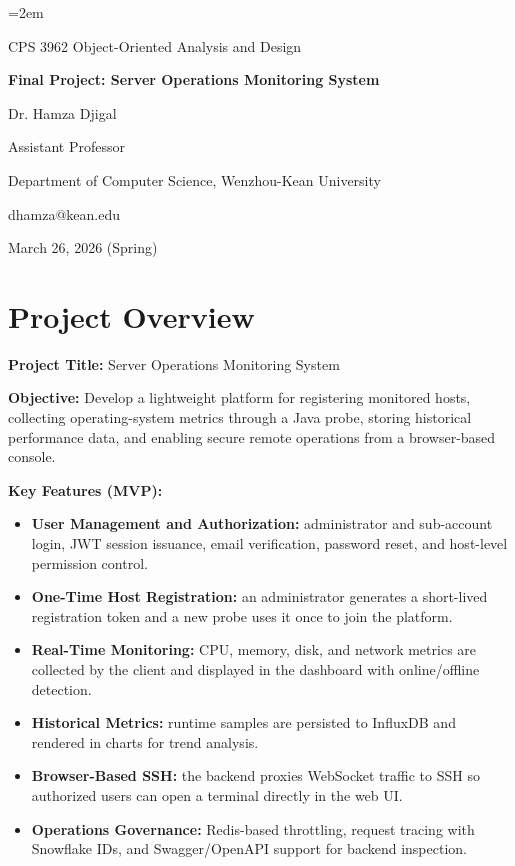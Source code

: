 \documentclass[11pt,a4paper]{article}
\begin{document}
\emergencystretch=2em

\begin{titlepage}
  \centering
  {\Large CPS 3962 Object-Oriented Analysis and Design \par}
  \vspace{1cm}
  {\LARGE \textbf{Final Project: Server Operations Monitoring System}\par}
  \vspace{0.6cm}
  {\large Dr. Hamza Djigal\par}
  {\large Assistant Professor\par}
  {\large Department of Computer Science, Wenzhou-Kean University\par}
  {\large dhamza@kean.edu\par}
  \vfill
  {\large March 26, 2026 (Spring)\par}
\end{titlepage}

\tableofcontents
\newpage
{}

\section{Project Overview}

\textbf{Project Title:} Server Operations Monitoring System

\textbf{Objective:} Develop a lightweight platform for registering monitored hosts, collecting operating-system metrics through a Java probe, storing historical performance data, and enabling secure remote operations from a browser-based console.

\textbf{Key Features (MVP):}
\begin{itemize}
  \item \textbf{User Management and Authorization:} administrator and sub-account login, JWT session issuance, email verification, password reset, and host-level permission control.
  \item \textbf{One-Time Host Registration:} an administrator generates a short-lived registration token and a new probe uses it once to join the platform.
  \item \textbf{Real-Time Monitoring:} CPU, memory, disk, and network metrics are collected by the client and displayed in the dashboard with online/offline detection.
  \item \textbf{Historical Metrics:} runtime samples are persisted to InfluxDB and rendered in charts for trend analysis.
  \item \textbf{Browser-Based SSH:} the backend proxies WebSocket traffic to SSH so authorized users can open a terminal directly in the web UI.
  \item \textbf{Operations Governance:} Redis-based throttling, request tracing with Snowflake IDs, and Swagger/OpenAPI support for backend inspection.
\end{itemize}
\end{document}
